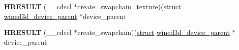 \begin{DoxyCompactItemize}
\item 
\mbox{\label{structwined3d__device__parent__ops_ae0070bd0037932b6754ea3a26924fd6a}} 
{\bfseries H\+R\+E\+S\+U\+LT} (\+\_\+\+\_\+cdecl $\ast$create\+\_\+swapchain\+\_\+texture)(\hyperlink{interfacestruct}{struct} \hyperlink{structwined3d__device__parent}{wined3d\+\_\+device\+\_\+parent} $\ast$device\+\_\+parent
\item 
\mbox{\label{structwined3d__device__parent__ops_a4ffabdb39b2de8809b42021ae011c6d9}} 
{\bfseries H\+R\+E\+S\+U\+LT} (\+\_\+\+\_\+cdecl $\ast$create\+\_\+swapchain)(\hyperlink{interfacestruct}{struct} \hyperlink{structwined3d__device__parent}{wined3d\+\_\+device\+\_\+parent} $\ast$device\+\_\+parent
\end{DoxyCompactItemize}
